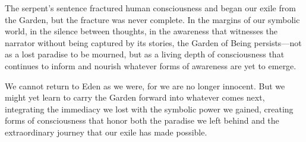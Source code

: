 The serpent's sentence fractured human consciousness and began our exile from the Garden, but the fracture was never complete. In the margins of our symbolic world, in the silence between thoughts, in the awareness that witnesses the narrator without being captured by its stories, the Garden of Being persists—not as a lost paradise to be mourned, but as a living depth of consciousness that continues to inform and nourish whatever forms of awareness are yet to emerge.

We cannot return to Eden as we were, for we are no longer innocent. But we might yet learn to carry the Garden forward into whatever comes next, integrating the immediacy we lost with the symbolic power we gained, creating forms of consciousness that honor both the paradise we left behind and the extraordinary journey that our exile has made possible.

